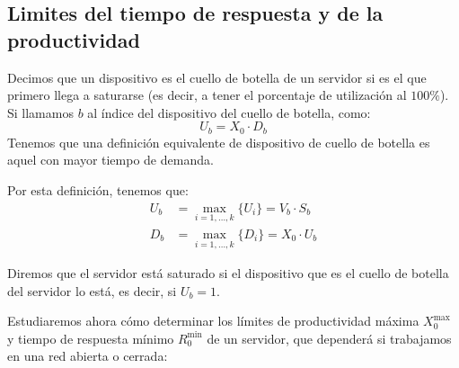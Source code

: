 \subsection{Limites del tiempo de respuesta y de la productividad}
\begin{definicion}
    Decimos que un dispositivo es el cuello de botella de un servidor si es el que primero llega a saturarse (es decir, a tener el porcentaje de utilización al $100\%$). Si llamamos $b$ al índice del dispositivo del cuello de botella, como:
    \begin{equation*}
        U_b = X_0 \cdot D_b
    \end{equation*}
    Tenemos que una definición equivalente de dispositivo de cuello de botella es aquel con mayor tiempo de demanda.
\end{definicion}
Por esta definición, tenemos que:
\begin{align*}
    U_b &= \max_{i = 1, \ldots, k}\{U_i\} = V_b\cdot S_b\\
    D_b &= \max_{i = 1, \ldots, k}\{D_i\} = X_0\cdot U_b
\end{align*}

\begin{definicion}
    Diremos que el servidor está saturado si el dispositivo que es el cuello de botella del servidor lo está, es decir, si $U_b = 1$.
\end{definicion}

Estudiaremos ahora cómo determinar los límites de productividad máxima $X_0^{\text{max}}$ y tiempo de respuesta mínimo $R_0^{\text{min}}$ de un servidor, que dependerá si trabajamos en una red abierta o cerrada:

